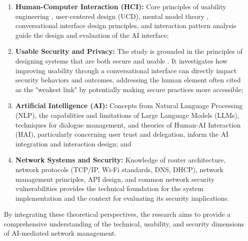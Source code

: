 \begin{enumerate}
\item \textbf{Human-Computer Interaction (HCI):} Core principles of usability engineering \cite{network_complexity_survey}, user-centered design (UCD), mental model theory \cite{router_logs}, conversational interface design principles, and interaction pattern analysis guide the design and evaluation of the AI interface;

\item \textbf{Usable Security and Privacy:} The study is grounded in the principles of designing systems that are both secure and usable \cite{home_network_challenges}. It investigates how improving usability through a conversational interface can directly impact security behaviors and outcomes, addressing the human element often cited as the "weakest link" by potentially making secure practices more accessible;

\item \textbf{Artificial Intelligence (AI):} Concepts from Natural Language Processing (NLP), the capabilities and limitations of Large Language Models (LLMs), techniques for dialogue management, and theories of Human-AI Interaction (HAI), particularly concerning user trust and delegation, inform the AI integration and interaction design; and

\item \textbf{Network Systems and Security:} Knowledge of router architecture, network protocols (TCP/IP, Wi-Fi standards, DNS, DHCP), network management principles, API design, and common network security vulnerabilities \cite{router_password_study} provides the technical foundation for the system implementation and the context for evaluating its security implications.
\end{enumerate}

By integrating these theoretical perspectives, the research aims to provide a comprehensive understanding of the technical, usability, and security dimensions of AI-mediated network management.

